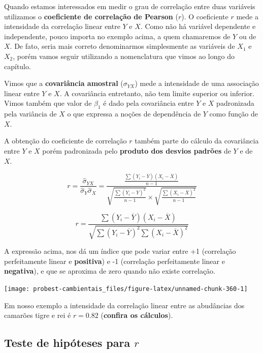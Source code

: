 \documentclass[
]{book}
\begin{document}
Quando estamos interessados em medir o grau de correlação entre duas variáveis utilizamos o \textbf{coeficiente de correlação de Pearson} (\textbf{\(r\)}). O coeficiente \(r\) mede a intensidade da correlação linear entre \(Y\) e \(X\). Como não há variável dependente e independente, pouco importa no exemplo acima, a quem chamaremos de \(Y\) ou de \(X\). De fato, seria mais correto denominarmos simplesmente as variáveis de \(X_1\) e \(X_2\), porém vamos seguir utilizando a nomenclatura que vimos ao longo do capítulo.

Vimos que a \textbf{covariância amostral} (\(\sigma_{YX}\)) mede a intensidade de uma associação linear entre \(Y\) e \(X\). A covariância entretanto, não tem limite superior ou inferior. Vimos também que valor de \(\beta_1\) é dado pela covariância entre \(Y\) e \(X\) padronizada pela variância de \(X\) o que expressa a noções de dependência de \(Y\) como função de \(X\).

A obtenção do coeficiente de correlação \(r\) também parte do cálculo da covariância entre \(Y\) e \(X\) porém padronizada pelo \textbf{produto dos desvios padrões} de \(Y\) e de \(X\).

\[r = \frac{\hat{\sigma}_{YX}}{\hat{\sigma}_Y \hat{\sigma}_X} = 
\frac{\frac{\sum{(Y_i - \overline{Y})(X_i - \overline{X})}}{n-1}}
{\sqrt{\frac{\sum{(Y_i - \overline{Y})^2}}{n-1}}  \times 
\sqrt{\frac{\sum{(X_i - \overline{X})^2}}{n-1}}}\]

\[r = \frac{\sum{(Y_i - \overline{Y})(X_i - \overline{X})}}{\sqrt{\sum{(Y_i - \overline{Y})^2 \sum{(X_i - \overline{X})^2}}}}\]

A expressão acima, nos dá um índice que pode variar entre +1 (correlação perfeitamente linear e \textbf{positiva}) e -1 (correlação perfeitamente linear e \textbf{negativa}), e que se aproxima de zero quando não existe correlação.

\begin{center}\texttt{[image: probest-cambientais\_files/figure-latex/unnamed-chunk-360-1]} \end{center}

Em nosso exemplo a intensidade da correlação linear entre as abudâncias dos camarões tigre e rei é \(r = 0.82\) (\textbf{confira os cálculos}).

\hypertarget{teste-de-hipuxf3teses-para-r}{%
\subsection{\texorpdfstring{Teste de hipóteses para \(r\)}{Teste de hipóteses para r}}\label{teste-de-hipuxf3teses-para-r}}
\end{document}
